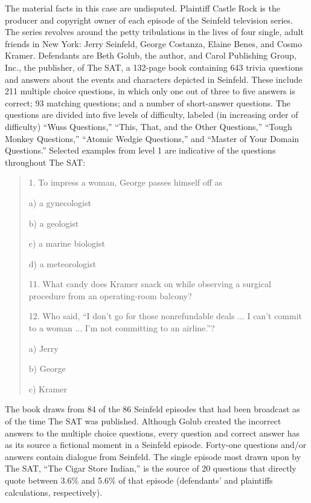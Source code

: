 The material facts in this case are undisputed. Plaintiff Castle Rock is the
producer and copyright owner of each episode of the Seinfeld television series.
The series revolves around the petty tribulations in the lives of four single,
adult friends in New York: Jerry Seinfeld, George Costanza, Elaine Benes, and
Cosmo Kramer. Defendants are Beth Golub, the author, and Carol Publishing
Group, Inc., the publisher, of The SAT, a 132-page book containing 643 trivia
questions and answers about the events and characters depicted in Seinfeld.
These include 211 multiple choice questions, in which only one out of three to
five answers is correct; 93 matching questions; and a number of short-answer
questions. The questions are divided into five levels of difficulty, labeled
(in increasing order of difficulty) ``Wuss Questions,'' ``This, That, and the
Other Questions,'' ``Tough Monkey Questions,'' ``Atomic Wedgie Questions,'' and
``Master of Your Domain Questions.'' Selected examples from level 1 are
indicative of the questions throughout The SAT:
\begin{quotation}
1. To impress a woman, George passes himself off as

a) a gynecologist

b) a geologist

c) a marine biologist

d) a meteorologist

11. What candy does Kramer snack on while observing a surgical procedure from an
operating-room balcony?

12. Who said, ``I don't go for those nonrefundable deals ... I can't commit to a
woman ... I'm not committing to an airline.''?

a) Jerry

b) George

c) Kramer
\end{quotation}
The book draws from 84 of the 86 Seinfeld episodes that had been broadcast as of
the time The SAT was published. Although Golub created the incorrect answers to
the multiple choice questions, every question and correct answer has as its
source a fictional moment in a Seinfeld episode. Forty-one questions and/or
answers contain dialogue from Seinfeld. The single episode most drawn upon by
The SAT, ``The Cigar Store Indian,'' is the source of 20 questions that
directly quote between 3.6\% and 5.6\% of that episode (defendants' and
plaintiffs calculations, respectively).

